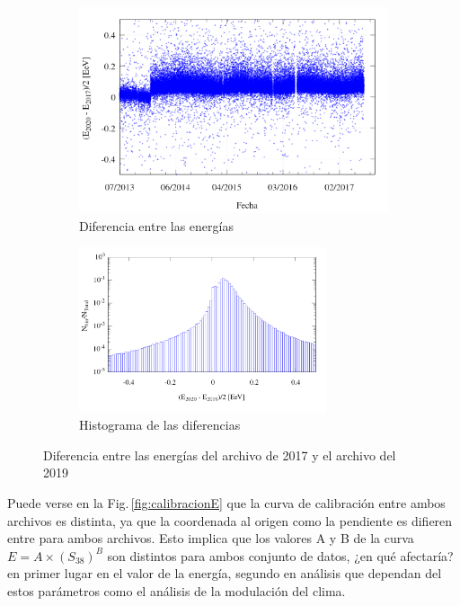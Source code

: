           \begin{figure}[H]
            \begin{subfigure}[b]{0.5\textwidth}
              \centering
              \includegraphics[width=\textwidth]{../0_Introduccion/comparacion_deltaE.png}
              \caption{Diferencia entre las energías} \label{fig:deltaE}
            \end{subfigure}%
            \begin{subfigure}[b]{0.5\textwidth}
              \centering
              \includegraphics[width=0.8\textwidth]{../0_Introduccion/histograma_deltaE.png}
              \caption{Histograma de las diferencias}   \label{fig:histograma}
            \end{subfigure}
            \caption{Diferencia entre las energías del archivo de 2017 y el archivo del 2019}
          \end{figure}

      Puede verse en la Fig.\,\ref{fig:calibracionE} que la curva de calibración entre ambos archivos es distinta, ya que la coordenada al origen como la pendiente es difieren entre para ambos archivos. Esto implica que los valores A y B de la curva $E=A\times (S_{38})^B$ son distintos para ambos conjunto de datos, ¿en qué afectaría? en primer lugar en el valor de la energía, segundo en análisis que dependan del estos parámetros como el análisis de la modulación del clima.

